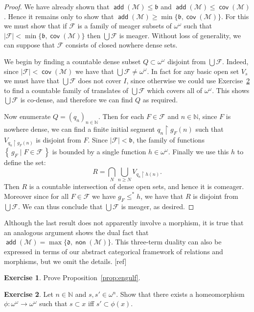 \documentclass[11pt,oneside]{amsbook}
\newcommand{\set}[1]{\left\{\,#1\,\right\}}
\newcommand{\N}{\mathbb N}
\newcommand{\Meager}{\mathcal M}
\DeclareMathOperator{\add}{\mathsf{add}}
\DeclareMathOperator{\non}{\mathsf{non}}
\DeclareMathOperator{\cov}{\mathsf{cov}}
\theoremstyle{definition}
\newtheorem{exerc}{Exercise}[section]
\theoremstyle{plain}
\theoremstyle{definition}
\theoremstyle{remark}
\numberwithin{equation}{section}
\numberwithin{figure}{section}
\begin{document}
\begin{proof}
  We have already shown that $\add(\Meager)\leq\mathfrak b$ and $\add(\Meager)\leq\cov(\Meager)$. Hence it remains only to show that $\add(\Meager)\geq\min\{\mathfrak b,\cov(\Meager)\}$. For this we must show that if $\mathcal F$ is a family of meager subsets of $\omega^\omega$ such that $|\mathcal F|<\min\{\mathfrak b,\cov(\Meager)\}$ then $\bigcup\mathcal F$ is meager. Without loss of generality, we can suppose that $\mathcal F$ consists of closed nowhere dense sets.

  We begin by finding a countable dense subset $Q\subset\omega^\omega$ disjoint from $\bigcup\mathcal F$. Indeed, since $|\mathcal F|<\cov(\Meager)$ we have that $\bigcup\mathcal F\neq\omega^\omega$. In fact for any basic open set $V_s$ we must have that $\bigcup\mathcal F$ does not cover $I$, since otherwise we could use Exercise~\ref{exerc:homeo} to find a countable family of translates of $\bigcup\mathcal F$ which covers all of $\omega^\omega$. This shows $\bigcup\mathcal F$ is co-dense, and therefore we can find $Q$ as required.

  Now enumerate $Q=(q_n)_{n\in\N}$. Then for each $F\in\mathcal F$ and $n\in\N$, since $F$ is nowhere dense, we can find a finite initial segment $q_n\restriction g_F(n)$ such that $V_{q_n\restriction g_F(n)}$ is disjoint from $F$. Since $|\mathcal F|<\mathfrak b$, the family of functions $\set{g_F\mid F\in\mathcal F}$ is bounded by a single function $h\in\omega^\omega$. Finally we use this $h$ to define the set:
  \[R=\bigcap_N\bigcup_{n\geq N}V_{q_n\restriction h(n)}\text{.}
  \]
  Then $R$ is a countable intersection of dense open sets, and hence it is comeager. Moreover since for all $F\in\mathcal F$ we have $g_F\leq^*h$, we have that $R$ is disjoint from $\bigcup\mathcal F$. We can thus conclude that $\bigcup\mathcal F$ is meager, as desired.
\end{proof}

Although the last result does not apparently involve a morphism, it is true that an analogous argument shows the dual fact that $\add(\Meager)=\max\{\mathfrak d,\non(\Meager)\}$. This three-term duality can also be expressed in terms of our abstract categorical framework of relations and morphisms, but we omit the details. [ref]

\begin{exerc}
  \label{exerc:engulf}
  Prove Proposition~\ref{prop:engulf}.
\end{exerc}

\begin{exerc}
  \label{exerc:homeo}
  Let $n\in\N$ and $s,s'\in\omega^n$. Show that there exists a homeomorphism $\phi\colon\omega^\omega\to\omega^\omega$ such that $s\subset x$ iff $s'\subset\phi(x)$.
\end{exerc}
\end{document}

